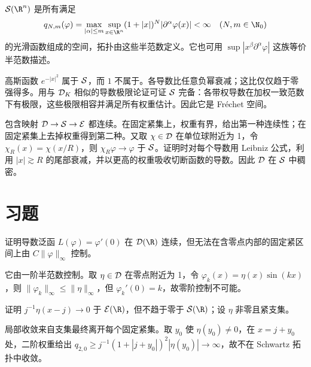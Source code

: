 \begin{definition}[Schwartz 空间]
$\Sch(\R^n)$ 是所有满足
\[
 q_{N,m}(\varphi)=\max_{|\alpha|\le m}\sup_{x\in\R^n}
 (1+|x|)^N|\partial^\alpha\varphi(x)|<\infty
 \quad(N,m\in\N_0)
\]
的光滑函数组成的空间，拓扑由这些半范数定义。它也可用 $\sup|x^\beta\partial^\alpha\varphi|$ 这族等价半范数描述。
\end{definition}
高斯函数 $e^{-|x|^2}$ 属于 $\mathcal{S}$，而 $1$ 不属于。各导数比任意负幂衰减；这比仅仅趋于零强得多。用与 $\mathcal{D}_K$ 相似的导数极限论证可证 $\mathcal{S}$ 完备：各带权导数在加权一致范数下有极限，这些极限相容并满足所有权重估计。因此它是 Fréchet 空间。

包含映射 $\mathcal{D}\to\mathcal{S}\to\mathcal{E}$ 都连续。在固定紧集上，权重有界，给出第一种连续性；在固定紧集上去掉权重得到第二种。又取 $\chi\in\mathcal{D}$ 在单位球附近为 1，令 $\chi_R(x)=\chi(x/R)$，则 $\chi_R\varphi\to\varphi$ 于 $\mathcal{S}$。证明时对每个导数用 Leibniz 公式，利用 $|x|\gtrsim R$ 的尾部衰减，并以更高的权重吸收切断函数的导数。因此 $\mathcal{D}$ 在 $\mathcal{S}$ 中稠密。

\section{习题}
\begin{exercise}[零阶范数不够]
证明导数泛函 $L(\varphi)=\varphi'(0)$ 在 $\Test(\R)$ 连续，但无法在含零点内部的固定紧区间上由 $C\|\varphi\|_\infty$ 控制。
\end{exercise}
\begin{solution}
它由一阶半范数控制。取 $\eta\in\mathcal{D}$ 在零点附近为 1，令 $\varphi_k(x)=\eta(x)\sin(kx)$，则 $\|\varphi_k\|_\infty\le\|\eta\|_\infty$，但 $\varphi_k'(0)=k$，故零阶控制不可能。
\end{solution}
\begin{exercise}[固定支集与快速衰减]
证明 $j^{-1}\eta(x-j)\to0$ 于 $\Smooth(\R)$，但不趋于零于 $\Sch(\R)$；设 $\eta$ 非零且紧支集。
\end{exercise}
\begin{solution}
局部收敛来自支集最终离开每个固定紧集。取 $y_0$ 使 $\eta(y_0)\ne0$，在 $x=j+y_0$ 处，二阶权重给出 $q_{2,0}\ge j^{-1}(1+|j+y_0|)^2|\eta(y_0)|\to\infty$，故不在 Schwartz 拓扑中收敛。
\end{solution}
